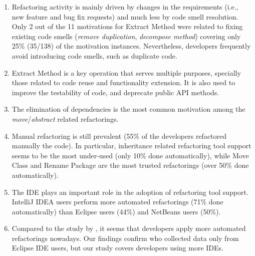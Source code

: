 \begin{enumerate}
	\item Refactoring activity is mainly driven by changes in the requirements (i.e., new feature and bug fix requests)
	and much less by code smell resolution.
	Only 2 out of the 11 motivations for {\textsc Extract Method} were related to fixing existing code smells (\emph{remove duplication}, \emph{decompose method}) covering only 25\% (35/138) of the motivation instances. Nevertheless, developers frequently avoid introducing code smells, such as duplicate code.
	\item {\textsc Extract Method} is a key operation that serves multiple purposes, specially those related to code
	reuse and functionality extension. It is also used to improve the testability of code, and deprecate public API methods.
	\item The elimination of dependencies is the most common motivation among the \emph{move}/\emph{abstract} related refactorings.
	\item Manual refactoring is still prevalent (55\% of the developers refactored manually the code).
	In particular, inheritance related refactoring tool support seems to be the most under-used (only 10\% done automatically),
	while {\textsc Move Class} and {\textsc Rename Package} are the most trusted refactorings (over 50\% done automatically).
	\item The IDE plays an important role in the adoption of refactoring tool support. IntelliJ IDEA users perform more automated refactorings (71\% done automatically) than Eclipse users (44\%) and NetBeans users (50\%).
	\item Compared to the study by \cite{MurphyHill2012}, it seems that developers apply more automated refactorings nowadays.
	Our findings confirm \cite{negara2013} who collected data only from Eclipse IDE users, but our study covers developers using more IDEs.
\end{enumerate}


